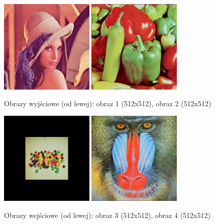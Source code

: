\documentclass[final,a4paper,openany,12pt]{mwbk}
\begin{document}
\begin{figure}[H]
	\begin{center}
		\includegraphics[width=0.4\textwidth]{lena_color_unificationRas_result}
		\includegraphics[width=0.4\textwidth]{peppers_color_unificationRas_result}
	\end{center}
	\caption{Obrazy wyjściowe (od lewej): obraz 1 (512x512), obraz 2 (512x512)}
\end{figure}

\begin{figure}[H]
	\begin{center}
		\includegraphics[width=0.4\textwidth]{candy_color_unificationGeo_result}
		\includegraphics[width=0.4\textwidth]{mandrill_color_unificationGeo_result}
	\end{center}
	\caption{Obrazy wejściowe (od lewej): obraz 3 (512x512), obraz 4 (512x512)}
\end{figure}
\end{document}
